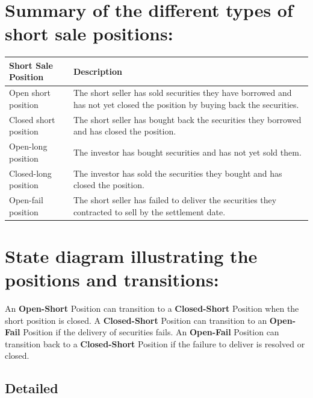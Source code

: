 \documentclass[11pt]{article}
\begin{document}
\section{Summary of the different types of short sale positions:}
\label{sec:org045ae29}
\begin{center}
\begin{tabular}{ll}
\hline
Short Sale Position & Description\\[0pt]
\hline
Open short position & The short seller has sold securities they have borrowed and has not yet closed the position by buying back the securities.\\[0pt]
Closed short position & The short seller has bought back the securities they borrowed and has closed the position.\\[0pt]
Open-long position & The investor has bought securities and has not yet sold them.\\[0pt]
Closed-long position & The investor has sold the securities they bought and has closed the position.\\[0pt]
Open-fail position & The short seller has failed to deliver the securities they contracted to sell by the settlement date.\\[0pt]
\hline
\end{tabular}
\end{center}


\section{State diagram illustrating the positions and transitions:}
\label{sec:org8983ebb}

An \textbf{Open-Short} Position can transition to a \textbf{Closed-Short} Position when the short position is closed.
A \textbf{Closed-Short} Position can transition to an \textbf{Open-Fail} Position if the delivery of securities fails.
An \textbf{Open-Fail} Position can transition back to a \textbf{Closed-Short} Position if the failure to deliver is resolved or closed.

\subsection{Detailed}
\label{sec:orge6da980}
\end{document}
